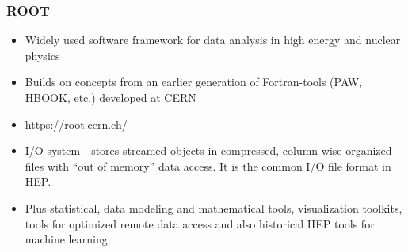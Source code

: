 \begin{frame}
\frametitle{ROOT}

\begin{itemize}
\item Widely used software framework for data analysis in high energy and nuclear physics
\item Builds on concepts from an earlier generation of Fortran-tools (PAW, HBOOK, etc.) developed at CERN
\item \url{https://root.cern.ch/}
\item I/O system - stores streamed objects in compressed, column-wise organized files with ``out of memory'' data access. It is the common I/O file format in HEP.
\item Plus statistical, data modeling and mathematical tools, visualization toolkits, tools for optimized remote data access and  also historical HEP tools for machine learning.
\end{itemize}

\end{frame}


